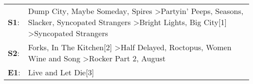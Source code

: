 \begin{supertabular}{p{0.03\textwidth}p{0.92\textwidth}}
 \textbf{S1}:  &  Dump City\textsuperscript{}, \enspace Maybe Someday\textsuperscript{}, \enspace Spires\textsuperscript{} \textgreater \enspace Partyin' Peeps\textsuperscript{}, \enspace Seasons\textsuperscript{}, \enspace Slacker\textsuperscript{}, \enspace Syncopated Strangers\textsuperscript{} \textgreater \enspace Bright Lights, Big City[1]\textsuperscript{} \textgreater \enspace Syncopated Strangers\textsuperscript{}  \enspace  \\
 \textbf{S2}:  &                                                                                                                  Forks\textsuperscript{}, \enspace In The Kitchen[2]\textsuperscript{} \textgreater \enspace Half Delayed\textsuperscript{}, \enspace Roctopus\textsuperscript{}, \enspace Women Wine and Song\textsuperscript{} \textgreater \enspace Rocker Part 2\textsuperscript{}, \enspace August\textsuperscript{}  \enspace  \\
 \textbf{E1}:  &                                                                                                                                                                                                                                                                                                                                                                                     Live and Let Die[3]\textsuperscript{}  \enspace  \\
\end{supertabular}
